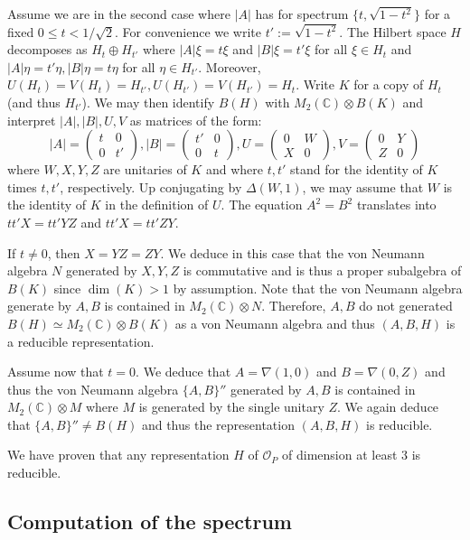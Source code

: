 \documentclass[12pt, a4paper]{amsart}
\def\dim{\operatorname{dim}}
\def\C{\mathbb{C}}
\newcommand{\IC}[0]{\mathbb{C}} \newcommand{\ID}[0]{\mathbb{D}}
\newcommand{\CO}[0]{\mathcal{O}} \newcommand{\CP}[0]{\mathcal{P}}
\numberwithin{equation}{section}
\begin{document}
Assume we are in the second case where $|A|$ has for spectrum $\{ t,\sqrt{1-t^2} \}$ for a fixed $0\leq t<1/\sqrt 2$. 
For convenience we write $t':=\sqrt{1-t^2}.$
The Hilbert space $H$ decomposes as $H_t\oplus H_{t'}$ where $|A|\xi=t\xi$ and $|B|\xi=t'\xi$ for all $\xi\in H_t$ and $|A|\eta=t'\eta, |B|\eta=t\eta$ for all $\eta\in H_{t'}.$
Moreover, $U(H_t)=V(H_t)=H_{t'}, U(H_{t'})=V(H_{t'})=H_t$.
Write $K$ for a copy of $H_t$ (and thus $H_{t'}$).
We may then identify $B(H)$ with $M_2(\C)\otimes B(K)$ and interpret $|A|, |B|, U, V$ as matrices of the form:
$$|A|=\begin{pmatrix}t & 0 \\ 0 & t'\end{pmatrix}, |B|=\begin{pmatrix}t' & 0 \\ 0 & t\end{pmatrix}, U=\begin{pmatrix} 0 & W \\ X & 0\end{pmatrix}, V=\begin{pmatrix} 0 & Y \\ Z & 0\end{pmatrix}$$
where $W,X,Y,Z$ are unitaries of $K$ and where $t,t'$ stand for the identity of $K$ times $t,t'$, respectively.
Up conjugating by $\Delta(W,1)$, we may assume that $W$ is the identity of $K$ in the definition of $U.$
The equation $A^2=B^2$ translates into $tt'X=tt'YZ$ and $tt'X=tt'ZY$.

If $t\neq 0$, then $X=YZ=ZY.$
We deduce in this case that the von Neumann algebra $N$ generated by $X,Y,Z$ is commutative and is thus a proper subalgebra of $B(K)$ since $\dim(K)>1$ by assumption.
Note that the von Neumann algebra generate by $A,B$ is contained in $M_2(\C)\otimes N$.
Therefore, $A,B$ do not generated $B(H)\simeq M_2(\C)\otimes B(K)$ as a von Neumann algebra and thus $(A,B,H)$ is a reducible representation.

Assume now that $t=0.$
We deduce that $A=\nabla(1,0)$ and $B=\nabla(0,Z)$ and thus the von Neumann algebra $\{A,B\}''$ generated by $A,B$ is contained in $M_2(\IC)\otimes M$ where $M$ is generated by the single unitary $Z$. We again deduce that $\{A,B\}'' \neq B(H)$ and thus the representation $(A,B,H)$ is reducible.

We have proven that any representation $H$ of $\CO_P$ of dimension at least $3$ is reducible.

\subsection{Computation of the spectrum}\label{sec:proof-main}
\end{document}
